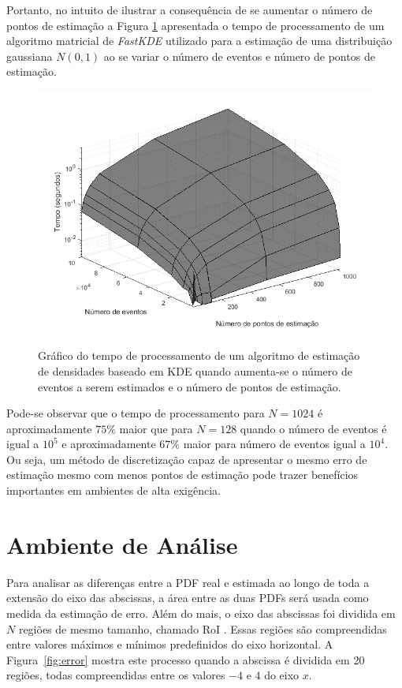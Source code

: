 Portanto, no intuito de ilustrar a consequência de se aumentar o número de pontos de estimação a Figura \ref{fig:compKDE} apresentada o tempo de processamento de um algoritmo matricial de \textit{FastKDE} utilizado para a estimação de uma distribuição gaussiana $N(0,1)$ ao se variar o número de eventos e número de pontos de estimação.

\begin{figure}[!ht]
	\centering
	\includegraphics[width=0.8\linewidth]{./figuras/custocomp.png}\\
	\caption{Gráfico do tempo de processamento de um algoritmo de estimação de densidades baseado em KDE quando aumenta-se o número de eventos a serem estimados e o número de pontos de estimação.}
	\label{fig:compKDE}
\end{figure}

Pode-se observar que o tempo de processamento para $N = 1024$ é aproximadamente $75\%$ maior que para $N = 128$ quando o número de eventos é igual a $10^5$ e aproximadamente $67\%$ maior para número de eventos igual a $10^4$. Ou seja, um método de discretização capaz de apresentar o mesmo erro de estimação mesmo com menos pontos de estimação pode trazer benefícios importantes em ambientes de alta exigência.


\section{Ambiente de Análise}

Para analisar as diferenças entre a \ac{PDF} real e estimada ao longo de toda a extensão do eixo das abscissas, a área entre as duas \ac{PDF}s será usada como medida da estimação de erro. Além do mais, o eixo das abscissas foi dividida em $N$ regiões de mesmo tamanho, chamado \ac{RoI} \cite{ron1999art}. Essas regiões são compreendidas entre valores máximos e mínimos predefinidos do eixo horizontal. A Figura~\ref{fig:error} mostra este processo quando a abscissa é dividida em 20 regiões, todas compreendidas entre os valores $-4$ e $4$ do eixo $ x $.


